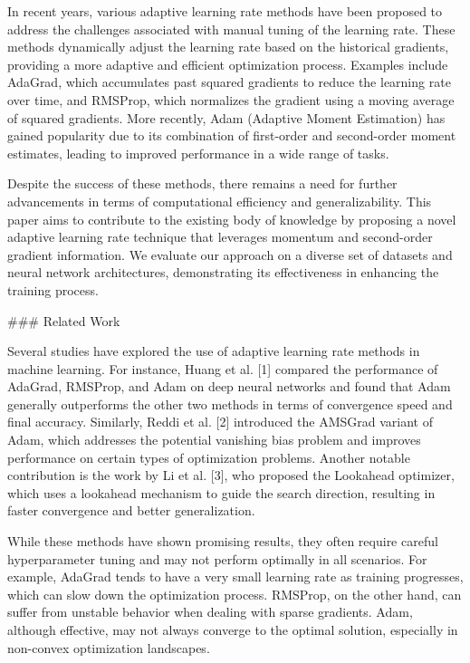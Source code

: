 In recent years, various adaptive learning rate methods have been proposed to address the challenges associated with manual tuning of the learning rate. These methods dynamically adjust the learning rate based on the historical gradients, providing a more adaptive and efficient optimization process. Examples include AdaGrad, which accumulates past squared gradients to reduce the learning rate over time, and RMSProp, which normalizes the gradient using a moving average of squared gradients. More recently, Adam (Adaptive Moment Estimation) has gained popularity due to its combination of first-order and second-order moment estimates, leading to improved performance in a wide range of tasks.

Despite the success of these methods, there remains a need for further advancements in terms of computational efficiency and generalizability. This paper aims to contribute to the existing body of knowledge by proposing a novel adaptive learning rate technique that leverages momentum and second-order gradient information. We evaluate our approach on a diverse set of datasets and neural network architectures, demonstrating its effectiveness in enhancing the training process.

### Related Work

Several studies have explored the use of adaptive learning rate methods in machine learning. For instance, Huang et al. [1] compared the performance of AdaGrad, RMSProp, and Adam on deep neural networks and found that Adam generally outperforms the other two methods in terms of convergence speed and final accuracy. Similarly, Reddi et al. [2] introduced the AMSGrad variant of Adam, which addresses the potential vanishing bias problem and improves performance on certain types of optimization problems. Another notable contribution is the work by Li et al. [3], who proposed the Lookahead optimizer, which uses a lookahead mechanism to guide the search direction, resulting in faster convergence and better generalization.

While these methods have shown promising results, they often require careful hyperparameter tuning and may not perform optimally in all scenarios. For example, AdaGrad tends to have a very small learning rate as training progresses, which can slow down the optimization process. RMSProp, on the other hand, can suffer from unstable behavior when dealing with sparse gradients. Adam, although effective, may not always converge to the optimal solution, especially in non-convex optimization landscapes.

